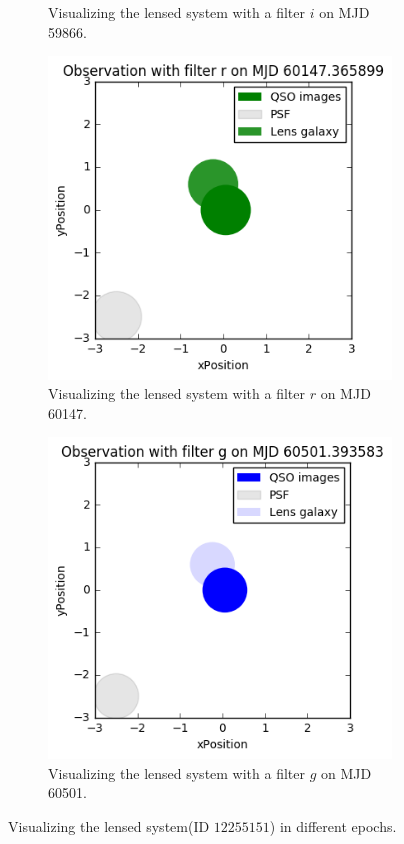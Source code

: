 \documentclass[\docopts]{\docclass}
\begin{document}
\begin{figure}
\begin{subfigure}[b]{0.2\textwidth}
        \caption{Visualizing the lensed system with a filter $i$ on MJD 59866.}
        \label{fig:vis_lens_b}
    \end{subfigure}
    \begin{subfigure}[b]{0.2\textwidth}
        \includegraphics[width=\textwidth]{plot-c.png}
        \caption{Visualizing the lensed system with a filter $r$ on MJD 60147.}
        \label{fig:vis_lens_c}
    \end{subfigure}
    \begin{subfigure}[b]{0.2\textwidth}
        \includegraphics[width=\textwidth]{plot-d.png}
        \caption{Visualizing the lensed system with a filter $g$ on MJD 60501.}
        \label{fig:vis_lens_d}
    \end{subfigure}
    \caption{Visualizing the lensed system(ID $12255151$) in different epochs.}
    \label{fig:visualization}
\end{figure}
\end{document}
